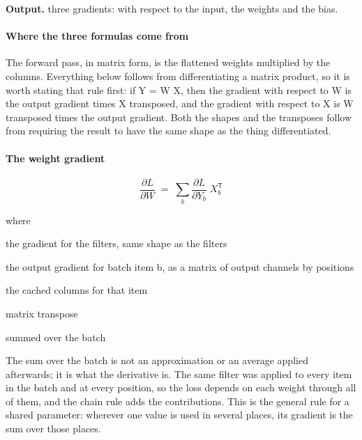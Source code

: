 \noindent\textbf{Output.} three gradients: with respect to the input, the weights and the bias.


\paragraph{Where the three formulas come from}
The forward pass, in matrix form, is the flattened weights multiplied by the columns. Everything below follows from differentiating a matrix product, so it is worth stating that rule first: if Y = W X, then the gradient with respect to W is the output gradient times X transposed, and the gradient with respect to X is W transposed times the output gradient. Both the shapes and the transposes follow from requiring the result to have the same shape as the thing differentiated.


\paragraph{The weight gradient}

\begin{equation}
\frac{\partial L}{\partial W} \;=\; \sum_{b} \frac{\partial L}{\partial Y_b} \; X_b^{\mathsf{T}}
\end{equation}

\noindent where
\begin{description}[leftmargin=2.4em,style=nextline,font=\normalfont\ttfamily]\setlength\itemsep{1pt}
  \item[{$\frac{\partial L}{\partial W}$}] \normalfont the gradient for the filters, same shape as the filters
  \item[{$\frac{\partial L}{\partial Y_b}$}] \normalfont the output gradient for batch item b, as a matrix of output channels by positions
  \item[{$X_b$}] \normalfont the cached columns for that item
  \item[{${}^{\mathsf{T}}$}] \normalfont matrix transpose
  \item[{$\sum_b$}] \normalfont summed over the batch
\end{description}
The sum over the batch is not an approximation or an average applied afterwards; it is what the derivative is. The same filter was applied to every item in the batch and at every position, so the loss depends on each weight through all of them, and the chain rule adds the contributions. This is the general rule for a shared parameter: wherever one value is used in several places, its gradient is the sum over those places.


